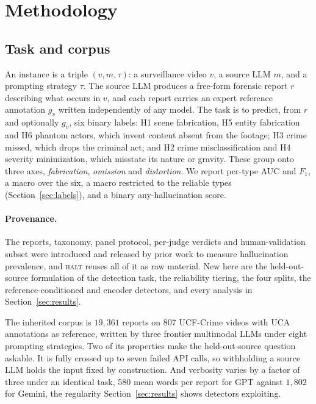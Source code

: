
\section{Methodology}
\label{sec:method}

\subsection{Task and corpus}
\label{sec:task}
\label{sec:corpus}

An instance is a triple $(v, m, \tau)$: a surveillance video $v$, a source LLM
$m$, and a prompting strategy $\tau$. The source LLM produces a free-form
forensic report $r$ describing what occurs in $v$, and each report carries an
expert reference annotation $g_v$ written independently of any model. The task
is to predict, from $r$ and optionally $g_v$, six binary labels: H1 scene
fabrication, H5 entity fabrication and H6 phantom actors, which invent content
absent from the footage; H3 crime missed, which drops the criminal act; and H2
crime misclassification and H4 severity minimization, which misstate its nature
or gravity. These group onto three axes, \emph{fabrication}, \emph{omission}
and \emph{distortion}. We report per-type AUC and $F_1$, a macro over the six,
a macro restricted to the reliable types (Section~\ref{sec:labels}), and a
binary any-hallucination score.

\paragraph{Provenance.} The reports, taxonomy, panel protocol, per-judge
verdicts and human-validation subset were introduced and released by
prior work \citep{priorwork2026} to measure hallucination prevalence, and \textsc{halt} reuses all of it as raw material. New here are the
held-out-source formulation of the detection task, the reliability tiering, the
four splits, the reference-conditioned and encoder detectors,
and every analysis in Section~\ref{sec:results}.

The inherited corpus is $19{,}361$ reports on 807 UCF-Crime videos
\citep{sultani2018real} with UCA annotations \citep{yuan2024towards} as
reference, written by three frontier multimodal LLMs under eight prompting
strategies. Two of its properties make the held-out-source question askable.
It is fully crossed up to seven failed API calls, so withholding a source LLM
holds
the input fixed by construction. And verbosity varies by a factor of three under an identical
task, 580 mean words per report for GPT against $1{,}802$ for Gemini, the
regularity Section~\ref{sec:results} shows detectors exploiting.

